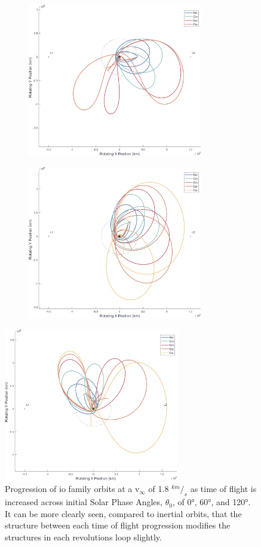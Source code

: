 \documentclass[letterpaper, paper,11pt]{AAS}	%
\begin{document}
\begin{figure}[h!]
    \begin{subfigure}{}
        \includegraphics[trim=75 50 0 0, clip, width=3in]{./figs/sunrot_FamilyPlot_io_vInf1.8_theta0.png}
    \end{subfigure}
    \begin{subfigure}{}
        \includegraphics[trim=75 50 0 0, clip, width=3in]{./figs/sunrot_FamilyPlot_io_vInf1.8_theta60.png}
    \end{subfigure}
\end{figure}
\begin{figure}[h]
    \centering
    \includegraphics[trim=75 50 0 0, clip, width=3in]{./figs/sunrot_FamilyPlot_io_vInf1.8_theta120.png}
    \caption{Progression of io family orbits at a v\(_\infty\) of 1.8 \(^{km}/_s\) as time of flight is increased across initial Solar Phase Angles, \(\theta_0\), of 0°, 60°, and 120°. It can be more clearly seen, compared to inertial orbits, that the structure between each time of flight progression modifies the structures in each revolutions loop slightly. }
    \label{fig:sunrot_famPlot_io_1.8}
\end{figure}
\end{document}
